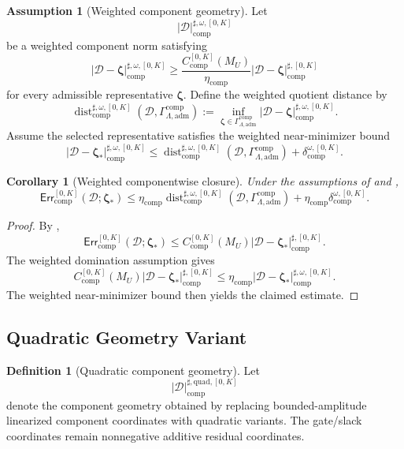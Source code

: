 \documentclass[11pt]{article}
\numberwithin{equation}{section}
\newtheorem{corollary}[corollary]{Corollary}
\theoremstyle{definition}
\newtheorem{definition}[definition]{Definition}
\newtheorem{assumption}[assumption]{Assumption}
\theoremstyle{remark}
\newcommand{\adm}{\mathrm{adm}}
\newcommand{\comp}{\mathrm{comp}}
\newcommand{\quadg}{\mathrm{quad}}
\newcommand{\Err}{\mathsf{Err}}
\newcommand{\Dist}{\operatorname{dist}}
\newcommand{\calD}{\mathcal D}
\newcommand{\bzeta}{\boldsymbol\zeta}
\newcommand{\Gcomp}{\Gamma_{\Lambda,\adm}^{\comp}}
\begin{document}
\begin{assumption}[Weighted component geometry]
\label{comp:ass:weighted-component}
Let
\[
    |\calD|_{\comp}^{\sharp,\omega,[0,K]}
\]
be a weighted component norm satisfying
\[
    |\calD-\bzeta|_{\comp}^{\sharp,\omega,[0,K]}
    \ge
    \frac{C_{\comp}^{[0,K]}(M_U)}{\eta_{\comp}}
    |\calD-\bzeta|_{\comp}^{\sharp,[0,K]}
\]
for every admissible representative \(\bzeta\).  Define the weighted quotient
distance by
\[
    \Dist_{\comp}^{\sharp,\omega,[0,K]}(\calD,\Gcomp)
    :=
    \inf_{\bzeta\in\Gcomp}
    |\calD-\bzeta|_{\comp}^{\sharp,\omega,[0,K]}.
\]
Assume the selected representative satisfies the weighted near-minimizer
bound
\[
    |\calD-\bzeta_*|_{\comp}^{\sharp,\omega,[0,K]}
    \le
    \Dist_{\comp}^{\sharp,\omega,[0,K]}(\calD,\Gcomp)
    +
    \delta_{\comp}^{\omega,[0,K]}.
\]
\end{assumption}

\begin{corollary}[Weighted componentwise closure]
\label{comp:cor:weighted-component-target}
Under the assumptions of  and
,
\[
    \Err_{\comp}^{[0,K]}(\calD;\bzeta_*)
    \le
    \eta_{\comp}
    \Dist_{\comp}^{\sharp,\omega,[0,K]}(\calD,\Gcomp)
    +
    \eta_{\comp}
    \delta_{\comp}^{\omega,[0,K]}.
\]
\end{corollary}

\begin{proof}
By ,
\[
    \Err_{\comp}^{[0,K]}(\calD;\bzeta_*)
    \le
    C_{\comp}^{[0,K]}(M_U)
    |\calD-\bzeta_*|_{\comp}^{\sharp,[0,K]}.
\]
The weighted domination assumption gives
\[
    C_{\comp}^{[0,K]}(M_U)
    |\calD-\bzeta_*|_{\comp}^{\sharp,[0,K]}
    \le
    \eta_{\comp}
    |\calD-\bzeta_*|_{\comp}^{\sharp,\omega,[0,K]}.
\]
The weighted near-minimizer bound then yields the claimed estimate.
\end{proof}

\subsection{Quadratic Geometry Variant}
\label{comp:sec:quadratic}

\begin{definition}[Quadratic component geometry]
\label{comp:def:quadratic-component-geometry}
Let
\[
    |\calD|_{\comp}^{\sharp,\quadg,[0,K]}
\]
denote the component geometry obtained by replacing bounded-amplitude
linearized component coordinates with quadratic variants.  The gate/slack
coordinates remain nonnegative additive residual coordinates.
\end{definition}
\end{document}
